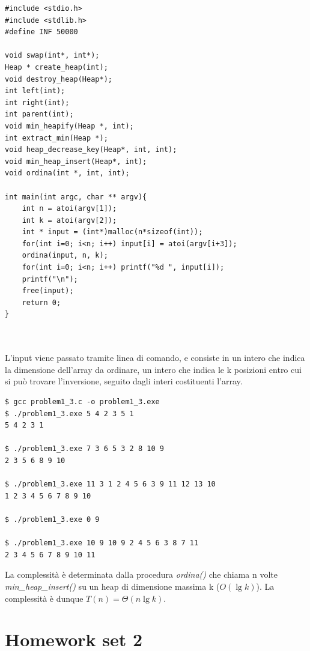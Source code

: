 \documentclass{article}
\begin{document}
\newpage
\begin{lstlisting}
#include <stdio.h>
#include <stdlib.h>
#define INF 50000

void swap(int*, int*);
Heap * create_heap(int);
void destroy_heap(Heap*);
int left(int);
int right(int);
int parent(int);
void min_heapify(Heap *, int);
int extract_min(Heap *);
void heap_decrease_key(Heap*, int, int);
void min_heap_insert(Heap*, int);
void ordina(int *, int, int);

int main(int argc, char ** argv){
    int n = atoi(argv[1]);
    int k = atoi(argv[2]);
    int * input = (int*)malloc(n*sizeof(int)); 
    for(int i=0; i<n; i++) input[i] = atoi(argv[i+3]);
    ordina(input, n, k);
    for(int i=0; i<n; i++) printf("%d ", input[i]);
    printf("\n");
    free(input);
    return 0;
}



\end{lstlisting}
\noindent
L'input viene passato tramite linea di comando, e consiste in un intero che indica la dimensione dell'array da ordinare, un intero che indica le k posizioni entro cui si può trovare l'inversione, seguito dagli interi costituenti l'array. 



\begin{commandline}
\begin{verbatim}
$ gcc problem1_3.c -o problem1_3.exe
$ ./problem1_3.exe 5 4 2 3 5 1 
5 4 2 3 1

$ ./problem1_3.exe 7 3 6 5 3 2 8 10 9 
2 3 5 6 8 9 10

$ ./problem1_3.exe 11 3 1 2 4 5 6 3 9 11 12 13 10 
1 2 3 4 5 6 7 8 9 10

$ ./problem1_3.exe 0 9

$ ./problem1_3.exe 10 9 10 9 2 4 5 6 3 8 7 11
2 3 4 5 6 7 8 9 10 11
\end{verbatim}
\end{commandline}

\noindent
La complessità è determinata dalla procedura \textit{ordina()} che chiama n volte \textit{min\_heap\_insert()} su un heap di dimensione massima k ($O(\lg{k})$). La complessità è dunque $T(n) = \Theta(n\lg{k})$.



\newpage
\section{Homework set 2} \label{sec:homework_2}%
\end{document}
